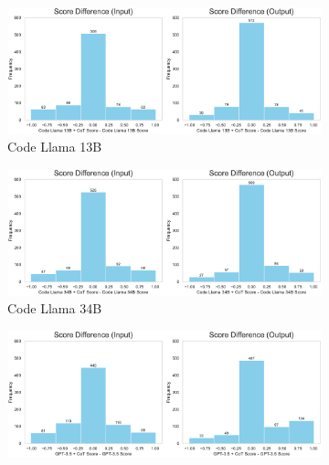 \begin{figure}[H]
     \centering
     \begin{subfigure}[t]{0.49\textwidth}
         \centering
         \includegraphics[width=\textwidth]{figs/confusion_cot/difference_histogram_codellama_13B_codellama_cot13B.pdf}
         \caption{Code Llama 13B}
     \end{subfigure}%
     \hfill
     \begin{subfigure}[t]{0.49\textwidth}
         \centering
         \includegraphics[width=\textwidth]{figs/confusion_cot/difference_histogram_codellama_30B_codellama_cot30B.pdf}
         \caption{Code Llama 34B}
     \end{subfigure}
     \newline
     \newline
     \newline
     \begin{subfigure}[t]{0.49\textwidth}
         \centering
         \includegraphics[width=\textwidth]{figs/confusion_cot/difference_histogram_gpt35_gpt35_cot.pdf}

\end{subfigure}
\end{figure}

